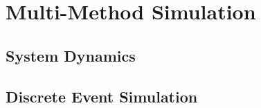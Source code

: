 \section{Multi-Method Simulation}

\subsection{System Dynamics}

\subsection{Discrete Event Simulation}
